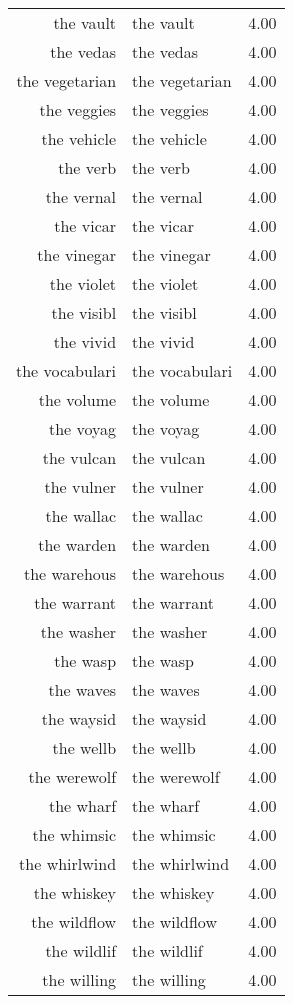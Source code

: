 \begin{table}[ht]
\begin{tabular}{rlr}
  the vault & the vault & 4.00 \\ 
  the vedas & the vedas & 4.00 \\ 
  the vegetarian & the vegetarian & 4.00 \\ 
  the veggies & the veggies & 4.00 \\ 
  the vehicle & the vehicle & 4.00 \\ 
  the verb & the verb & 4.00 \\ 
  the vernal & the vernal & 4.00 \\ 
  the vicar & the vicar & 4.00 \\ 
  the vinegar & the vinegar & 4.00 \\ 
  the violet & the violet & 4.00 \\ 
  the visibl & the visibl & 4.00 \\ 
  the vivid & the vivid & 4.00 \\ 
  the vocabulari & the vocabulari & 4.00 \\ 
  the volume & the volume & 4.00 \\ 
  the voyag & the voyag & 4.00 \\ 
  the vulcan & the vulcan & 4.00 \\ 
  the vulner & the vulner & 4.00 \\ 
  the wallac & the wallac & 4.00 \\ 
  the warden & the warden & 4.00 \\ 
  the warehous & the warehous & 4.00 \\ 
  the warrant & the warrant & 4.00 \\ 
  the washer & the washer & 4.00 \\ 
  the wasp & the wasp & 4.00 \\ 
  the waves & the waves & 4.00 \\ 
  the waysid & the waysid & 4.00 \\ 
  the wellb & the wellb & 4.00 \\ 
  the werewolf & the werewolf & 4.00 \\ 
  the wharf & the wharf & 4.00 \\ 
  the whimsic & the whimsic & 4.00 \\ 
  the whirlwind & the whirlwind & 4.00 \\ 
  the whiskey & the whiskey & 4.00 \\ 
  the wildflow & the wildflow & 4.00 \\ 
  the wildlif & the wildlif & 4.00 \\ 
  the willing & the willing & 4.00 \\ 

\end{tabular}
\end{table}
